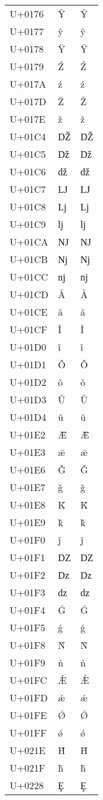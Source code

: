 \documentclass{article}
\begin{document}
\begin{longtable}{lll}
U+0176 & Ŷ & Ŷ \\
U+0177 & ŷ & ŷ \\
U+0178 & Ÿ & Ÿ \\
U+0179 & Ź & Ź \\
U+017A & ź & ź \\
U+017D & Ž & Ž \\
U+017E & ž & ž \\
U+01C4 & Ǆ & Ǆ \\
U+01C5 & ǅ & ǅ \\
U+01C6 & ǆ & ǆ \\
U+01C7 & Ǉ & Ǉ \\
U+01C8 & ǈ & ǈ \\
U+01C9 & ǉ & ǉ \\
U+01CA & Ǌ & Ǌ \\
U+01CB & ǋ & ǋ \\
U+01CC & ǌ & ǌ \\
U+01CD & Ǎ & Ǎ \\
U+01CE & ǎ & ǎ \\
U+01CF & Ǐ & Ǐ \\
U+01D0 & ǐ & ǐ \\
U+01D1 & Ǒ & Ǒ \\
U+01D2 & ǒ & ǒ \\
U+01D3 & Ǔ & Ǔ \\
U+01D4 & ǔ & ǔ \\
U+01E2 & Ǣ & Ǣ \\
U+01E3 & ǣ & ǣ \\
U+01E6 & Ǧ & Ǧ \\
U+01E7 & ǧ & ǧ \\
U+01E8 & Ǩ & Ǩ \\
U+01E9 & ǩ & ǩ \\
U+01F0 & ǰ & ǰ \\
U+01F1 & Ǳ & Ǳ \\
U+01F2 & ǲ & ǲ \\
U+01F3 & ǳ & ǳ \\
U+01F4 & Ǵ & Ǵ \\
U+01F5 & ǵ & ǵ \\
U+01F8 & Ǹ & Ǹ \\
U+01F9 & ǹ & ǹ \\
U+01FC & Ǽ & Ǽ \\
U+01FD & ǽ & ǽ \\
U+01FE & Ǿ & Ǿ \\
U+01FF & ǿ & ǿ \\
U+021E & Ȟ & Ȟ \\
U+021F & ȟ & ȟ \\
U+0228 & Ȩ & Ȩ \\

\end{longtable}
\end{document}
